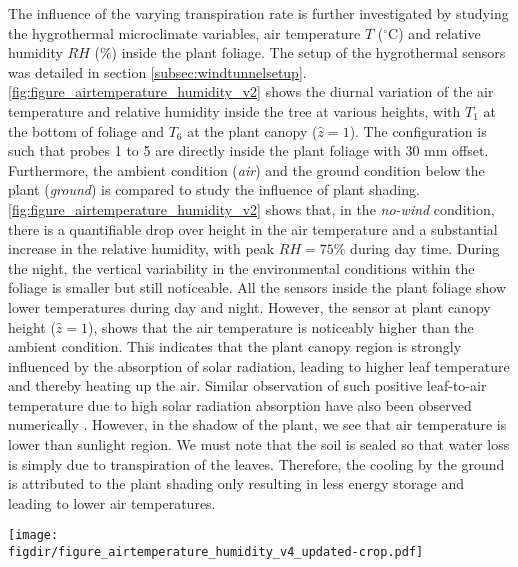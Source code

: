 The influence of the varying transpiration rate is further investigated by studying the hygrothermal microclimate variables, air temperature $T$ ($^{\circ}$C) and relative humidity $\textit{RH}$ (\%) inside the plant foliage. The setup of the hygrothermal sensors was detailed in section \cref{subsec:windtunnelsetup}.  \cref{fig:figure_airtemperature_humidity_v2} shows the diurnal variation of the air temperature and relative humidity inside the tree at various heights, with $T_1$ at the bottom of foliage and $T_6$ at the plant canopy ($\hat{z}=1$). The configuration is such that probes 1 to 5 are directly inside the plant foliage with $30$ mm offset. Furthermore, the ambient condition (\textit{air}) and the ground condition below the plant (\textit{ground}) is compared to study the influence of plant shading. \cref{fig:figure_airtemperature_humidity_v2} shows that, in the \textit{no-wind} condition, there is a quantifiable drop over height in the air temperature and a substantial increase in the relative humidity, with peak $\textit{RH}=75\%$ during day time. During the night, the vertical variability in the environmental conditions within the foliage is smaller but still noticeable. All the sensors inside the plant foliage show lower temperatures during day and night. However, the sensor at plant canopy height ($\hat{z}=1$), shows that the air temperature is noticeably higher than the ambient condition. This indicates that the plant canopy region is strongly influenced by the absorption of solar radiation, leading to higher leaf temperature and thereby heating up the air. Similar observation of such positive leaf-to-air temperature due to high solar radiation absorption have also been observed numerically \citep{Manickathan2018a}. However, in the shadow of the plant, we see that air temperature is lower than sunlight region. We must note that the soil is sealed so that water loss is simply due to transpiration of the leaves. Therefore, the cooling by the ground is attributed to the plant shading only resulting in less energy storage and leading to lower air temperatures. 

\begin{sidewaysfigure}[p]
	\centering
	\texttt{[image: \\figdir/figure\_airtemperature\_humidity\_v4\_updated-crop.pdf]}
	\caption{Diurnal variation of air temperature $T$ ($^{\circ}$C) and relative humidity $RH$ (\%) inside the tree at varying heights for two wind conditions:  \textit{no wind} and  \textit{wind} ($U_{ref}=1$ m\,s$^{-1}$).}
	\label{fig:figure_airtemperature_humidity_v2}
\end{sidewaysfigure}

